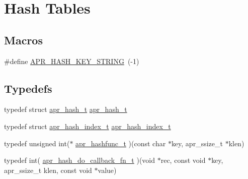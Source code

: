 \hypertarget{group__apr__hash}{\section{Hash Tables}
\label{group__apr__hash}
}
\subsection*{Macros}
\begin{DoxyCompactItemize}
\item 
\#define \hyperlink{group__apr__hash_ga3ba32541f2717b394000f87f38c7e12d}{A\-P\-R\-\_\-\-H\-A\-S\-H\-\_\-\-K\-E\-Y\-\_\-\-S\-T\-R\-I\-N\-G}~(-\/1)
\end{DoxyCompactItemize}
\subsection*{Typedefs}
\begin{DoxyCompactItemize}
\item 
typedef struct \hyperlink{group__apr__hash_ga72ec09b8bde6d874c36bd49df915fff6}{apr\-\_\-hash\-\_\-t} \hyperlink{group__apr__hash_ga72ec09b8bde6d874c36bd49df915fff6}{apr\-\_\-hash\-\_\-t}
\item 
typedef struct \hyperlink{group__apr__hash_ga3b3d353989f6cea4535630634be147f7}{apr\-\_\-hash\-\_\-index\-\_\-t} \hyperlink{group__apr__hash_ga3b3d353989f6cea4535630634be147f7}{apr\-\_\-hash\-\_\-index\-\_\-t}
\item 
typedef unsigned int($\ast$ \hyperlink{group__apr__hash_ga083e92cab31343c1ebb9073275e8166e}{apr\-\_\-hashfunc\-\_\-t} )(const char $\ast$key, apr\-\_\-ssize\-\_\-t $\ast$klen)
\item 
typedef int( \hyperlink{group__apr__hash_ga31696b2d87fbc5b626887a59f5ebb7d1}{apr\-\_\-hash\-\_\-do\-\_\-callback\-\_\-fn\-\_\-t} )(void $\ast$rec, const void $\ast$key, apr\-\_\-ssize\-\_\-t klen, const void $\ast$value)
\end{DoxyCompactItemize}
